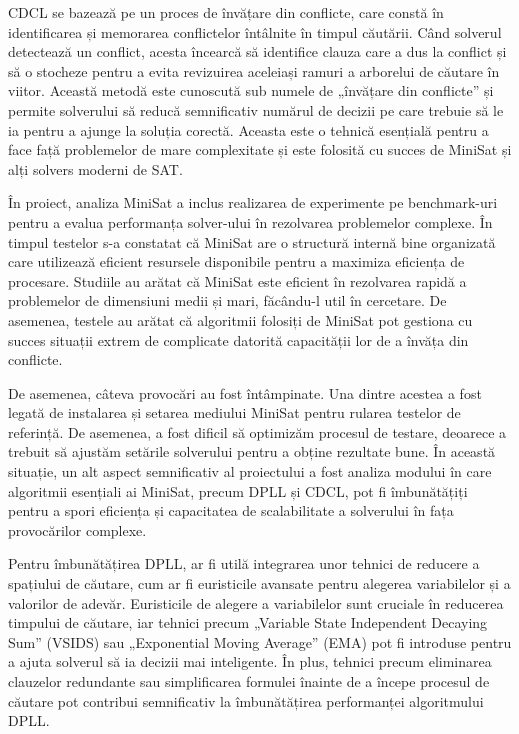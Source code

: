 \documentclass[12pt,a4paper]{report}
\begin{document}
CDCL se bazează pe un proces de învățare din conflicte, care constă în identificarea și memorarea conflictelor întâlnite în timpul căutării. Când solverul detectează un conflict, acesta încearcă să identifice clauza care a dus la conflict și să o stocheze pentru a evita revizuirea aceleiași ramuri a arborelui de căutare în viitor. Această metodă este cunoscută sub numele de „învățare din conflicte” și permite solverului să reducă semnificativ numărul de decizii pe care trebuie să le ia pentru a ajunge la soluția corectă. Aceasta este o tehnică esențială pentru a face față problemelor de mare complexitate și este folosită cu succes de MiniSat și alți solvers moderni de SAT.


În proiect, analiza MiniSat a inclus realizarea de experimente pe benchmark-uri pentru a evalua performanța solver-ului în rezolvarea problemelor complexe. În timpul testelor s-a constatat că MiniSat are o structură internă bine organizată care utilizează eficient resursele disponibile pentru a maximiza eficiența de procesare. Studiile au arătat că MiniSat este eficient în rezolvarea rapidă a problemelor de dimensiuni medii și mari, făcându-l util în cercetare. De asemenea, testele au arătat că algoritmii folosiți de MiniSat pot gestiona cu succes situații extrem de complicate datorită capacității lor de a învăța din conflicte.

De asemenea, câteva provocări au fost întâmpinate. Una dintre acestea a fost legată de instalarea și setarea mediului MiniSat pentru rularea testelor de referință. De asemenea, a fost dificil să optimizăm procesul de testare, deoarece a trebuit să ajustăm setările solverului pentru a obține rezultate bune. În această situație, un alt aspect semnificativ al proiectului a fost analiza modului în care algoritmii esențiali ai MiniSat, precum DPLL și CDCL, pot fi îmbunătățiți pentru a spori eficiența și capacitatea de scalabilitate a solverului în fața provocărilor complexe.

Pentru îmbunătățirea DPLL, ar fi utilă integrarea unor tehnici de reducere a spațiului de căutare, cum ar fi euristicile avansate pentru alegerea variabilelor și a valorilor de adevăr. Euristicile de alegere a variabilelor sunt cruciale în reducerea timpului de căutare, iar tehnici precum „Variable State Independent Decaying Sum” (VSIDS) sau „Exponential Moving Average” (EMA) pot fi introduse pentru a ajuta solverul să ia decizii mai inteligente. În plus, tehnici precum eliminarea clauzelor redundante sau simplificarea formulei înainte de a începe procesul de căutare pot contribui semnificativ la îmbunătățirea performanței algoritmului DPLL.
\end{document}
